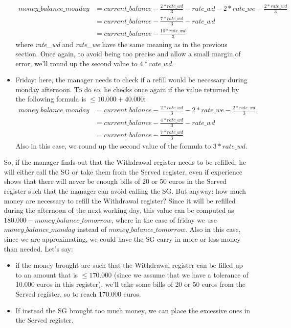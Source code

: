 \documentclass{article}
\begin{document}
\begin{itemize}
    \begin{equation*}
        \begin{aligned}
        money\_balance\_monday 
        & = current\_balance - \frac{2 * rate\_wd}{3} - rate\_wd - 2 * rate\_we - \frac{2* rate\_wd}{3}\\
        & = current\_balance - \frac{7*rate\_wd}{3} - rate\_wd\\
        & = current\_balance - \frac{10*rate\_wd}{3}
        \end{aligned}
    \end{equation*}
    where \emph{rate\_wd} and \emph{rate\_we} have the same meaning as in the previous section. Once again, to avoid being too precise and allow a small margin of error, we'll round up the second value to $4*rate\_wd$.
    \item Friday: here, the manager needs to check if a refill would be necessary during monday afternoon. To do so, he checks once again if the value returned by the following formula is $\leq 10.000 + 40.000$:
    \begin{equation*}
        \begin{aligned}
        money\_balance\_monday 
        & = current\_balance - \frac{2 * rate\_wd}{3} - 2 * rate\_we - \frac{2* rate\_wd}{3}\\
        & = current\_balance - \frac{4*rate\_wd}{3} - rate\_wd\\
        & = current\_balance - \frac{7*rate\_wd}{3}
        \end{aligned}
    \end{equation*}
    Also in this case, we round up the second value of the formula to $3*rate\_wd$.
\end{itemize}
So, if the manager finds out that the Withdrawal register needs to be refilled, he will either call the SG or take them from the Served register, even if experience shows that there will never be enough bills of 20 or 50 euros in the Served register such that the manager can avoid calling the SG. But anyway: how much money are necessary to refill the Withdrawal register? Since it will be refilled during the afternoon of the next working day, this value can be computed as $180.000 - money\_balance\_tomorrow$, where in the case of friday we use $money\_balance\_monday$ instead of $money\_balance\_tomorrow$. Also in this case, since we are approximating, we could have the SG carry in more or less money than needed. Let's say:
\begin{itemize}
    \item if the money brought are such that the Withdrawal register can be filled up to an amount that is $\leq 170.000$ (since we assume that we have a tolerance of 10.000 euros in this register), we'll take some bills of 20 or 50 euros from the Served register, so to reach 170.000 euros.
    \item If instead the SG brought too much money, we can place the excessive ones in the Served register.
\end{itemize}
\end{document}
